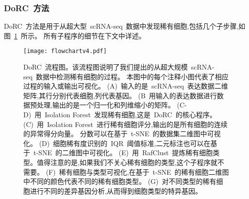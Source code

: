 \subsubsection{DoRC~方法}
DoRC~方法是用于从超大型~scRNA-seq~数据中发现稀有细胞,包括几个子步骤,如图~\ref{fig:flowchart}~所示。
所有子程序的细节在下文中详述。
\begin{figure}[!htbp]
    \centering
    \texttt{[image: flowchartv4.pdf]}
    \caption{DoRC~流程图。该流程图说明了我们提出的从超大规模~scRNA-seq~数据中检测稀有细胞的过程。
    本图中的每个注释小图代表了相应过程的输入或输出可视化。
    (A)~输入的是~scRNA-seq~表达数据二维矩阵,其行分别代表细胞,列代表基因。
    (B~用输入的表达数据进行数据预处理,输出的是一个归一化和列维缩小的矩阵。
    (C-D)~用~Isolation Forest~发现稀有细胞,这是~DoRC~的核心程序。
    (C)~用~Isolation Forest~进行稀有细胞评分,输出的是所有细胞的连续的异常得分向量。
    分数可以在基于~t-SNE~的数据集二维图中可视化。
    (D)~细胞稀有度识别的~IQR~阈值标准,二元标注也可以在基于~t-SNE~的二维图中可视化。
    (E)~用~RafClust~提炼稀有细胞类型。值得注意的是,如果我们不关心稀有细胞的类型,这个子程序就不需要。
    (F)~稀有细胞与类型可视化,在基于~t-SNE~的稀有细胞二维图中不同的颜色代表不同的稀有细胞类型。
    (G)~对不同类型的稀有细胞进行不同的差异基因分析,从而得到细胞类型的特异基因。
    }
    \label{fig:flowchart}
\end{figure}

